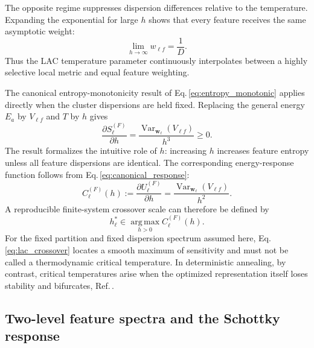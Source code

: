 \documentclass[11pt,a4paper]{article}
\newcommand{\Var}{\operatorname{Var}}
\theoremstyle{definition}
\theoremstyle{plain}
\begin{document}
The opposite regime suppresses dispersion differences relative to the temperature. Expanding the exponential for large $h$ shows that every feature receives the same asymptotic weight:
\begin{equation}
    \lim_{h\to\infty}w_{\ell f}
    =\frac{1}{D}.
    \label{eq:lac_highT}
\end{equation}
Thus the LAC temperature parameter continuously interpolates between a highly selective local metric and equal feature weighting.

The canonical entropy-monotonicity result of Eq.\,\eqref{eq:entropy_monotonic} applies directly when the cluster dispersions are held fixed. Replacing the general energy $E_a$ by $V_{\ell f}$ and $T$ by $h$ gives
\begin{equation}
    \frac{\partial S_\ell^{(F)}}{\partial h}
    =\frac{\Var_{\bm{w}_\ell}(V_{\ell f})}{h^3}
    \ge0.
    \label{eq:lac_entropy_monotonic}
\end{equation}
The result formalizes the intuitive role of $h$: increasing $h$ increases feature entropy unless all feature dispersions are identical. The corresponding energy-response function follows from Eq.\,\eqref{eq:canonical_response}:
\begin{equation}
    C_\ell^{(F)}(h)
    :=\frac{\partial U_\ell^{(F)}}{\partial h}
    =\frac{\Var_{\bm{w}_\ell}(V_{\ell f})}{h^2}.
    \label{eq:lac_response}
\end{equation}
A reproducible finite-system crossover scale can therefore be defined by
\begin{equation}
    h_\ell^*\in\operatorname*{arg\,max}_{h>0}C_\ell^{(F)}(h).
    \label{eq:lac_crossover}
\end{equation}
For the fixed partition and fixed dispersion spectrum assumed here, Eq.\,\eqref{eq:lac_crossover} locates a smooth maximum of sensitivity and must not be called a thermodynamic critical temperature. In deterministic annealing, by contrast, critical temperatures arise when the optimized representation itself loses stability and bifurcates, Ref.\,\cite{rose1990phase}.


\subsection{Two-level feature spectra and the Schottky response}
\label{subsec:lac_schottky}
\end{document}
